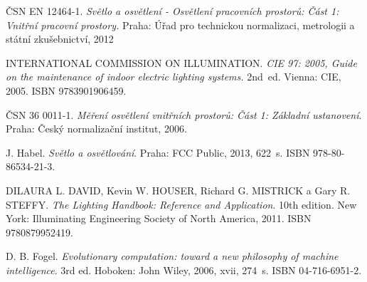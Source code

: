 \documentclass[Afour,sagev,times,doublespace]{sagej}
\begin{document}
\begin{thebibliography}{99}

\v{C}SN EN 12464-1. \textit{Sv\v{e}tlo a osv\v{e}tlen\'{i} - Osv\v{e}tlen\'{i} pracovn\'{i}ch prostor\r{u}: \v{C}\'{a}st 1: Vnit\v{r}n\'{i} pracovn\'{i} prostory.} Praha: \'{U}\v{r}ad pro technickou normalizaci, metrologii a st\'{a}tn\'{i} zku\v{s}ebnictv\'{i}, 2012

INTERNATIONAL COMMISSION ON ILLUMINATION.\textit{ CIE 97: 2005, Guide on the maintenance of indoor electric lighting systems.} 2nd~ed. Vienna: CIE, 2005. ISBN 9783901906459.

\v{C}SN 36 0011-1. \textit{M\v{e}\v{r}en\'{i} osv\v{e}tlen\'{i} vnit\v{r}n\'{i}ch prostor\r{u}: \v{C}\'{a}st 1: Z\'{a}kladn\'{i} ustanoven\'{i}}. Praha: \v{C}esk\'{y} normaliza\v{c}n\'{i} institut, 2006.


J. Habel. \textit{Sv\v{e}tlo a osv\v{e}tlov\'{a}n\'{i}}. Praha: FCC Public, 2013, 622~s. ISBN 978-80-86534-21-3.

DILAURA L. DAVID, Kevin W. HOUSER, Richard G. MISTRICK a Gary R. STEFFY. \textit{The Lighting Handbook: Reference and Application}. 10th edition. New York: Illuminating Engineering Society of North America, 2011. ISBN 9780879952419.

D. B. Fogel. \textit{Evolutionary computation: toward a new philosophy of machine intelligence}. 3rd ed. Hoboken: John Wiley, 2006, xvii, 274~s. ISBN 04-716-6951-2.

\end{thebibliography}
\end{document}
